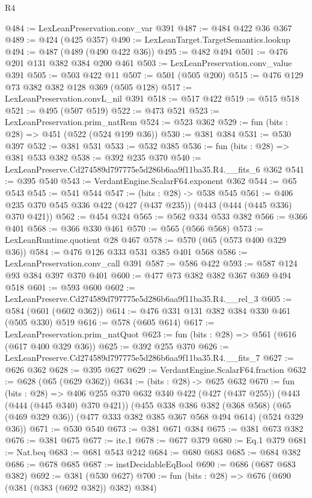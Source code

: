 \begin{lexlean}{R4}
\begin{coremodule}
@484 := LexLeanPreservation.conv_var @391
@487 := @484 @422 @36 @367
@489 := @424 (@425 @357)
@490 := LexLeanTarget.TargetSemantics.lookup
@494 := @487 (@489 (@490 @422 @36))
@495 := @482 @494
@501 := @476 @201 @131 @382 @384 @200 @461
@503 := LexLeanPreservation.conv_value @391
@505 := @503 @422 @11
@507 := @501 (@505 @200)
@515 := @476 @129 @73 @382 @382 @128 @369 (@505 @128)
@517 := LexLeanPreservation.convL_nil @391
@518 := @517 @422
@519 := @515 @518
@521 := @495 (@507 @519)
@522 := @473 @521
@523 := LexLeanPreservation.prim_natRem
@524 := @523 @362
@529 := fun (bits : @28) => @451 (@522 (@524 @199 @36))
@530 := @381 @384
@531 := @530 @397
@532 := @381 @531
@533 := @532 @385
@536 := fun (bits : @28) => @381 @533 @382
@538 := @392 @235 @370
@540 := LexLeanPreserve.Cd274589d797775e5d286b6aa9f11ba35.R4.__fits_6 @362
@541 := @395 @540
@543 := VerdantEngine.ScalarF64.exponent @362
@544 := @65 @543
@545 := @541 @544
@547 := (bits : @28) -> @538 @545
@561 := @406 @235 @370 @545 @336 @422 (@427 (@437 @235)) (@443 (@444 (@445 @336) @370 @421))
@562 := @454 @324
@565 := @562 @334 @533 @382
@566 := @366 @401
@568 := @366 @330 @461
@570 := @565 (@566 @568)
@573 := LexLeanRuntime.quotient @28 @467
@578 := @570 (@65 (@573 @400 @329 @36))
@584 := @476 @126 @333 @531 @385 @401 @568
@586 := LexLeanPreservation.conv_call @391
@587 := @586 @422
@593 := @587 @124 @93 @384 @397 @370 @401
@600 := @477 @73 @382 @382 @367 @369 @494 @518
@601 := @593 @600
@602 := LexLeanPreserve.Cd274589d797775e5d286b6aa9f11ba35.R4.__rel_3
@605 := @584 (@601 (@602 @362))
@614 := @476 @331 @131 @382 @384 @330 @461 (@505 @330) @519
@616 := @578 (@605 @614)
@617 := LexLeanPreservation.prim_natQuot
@623 := fun (bits : @28) => @561 (@616 (@617 @400 @329 @36))
@625 := @392 @255 @370
@626 := LexLeanPreserve.Cd274589d797775e5d286b6aa9f11ba35.R4.__fits_7
@627 := @626 @362
@628 := @395 @627
@629 := VerdantEngine.ScalarF64.fraction
@632 := @628 (@65 (@629 @362))
@634 := (bits : @28) -> @625 @632
@670 := fun (bits : @28) =>
  @406
    @255
    @370
    @632
    @340
    @422
    (@427 (@437 @255))
    (@443 (@444 (@445 @340) @370 @421))
    (@455
      @338
      @386
      @382
      (@368 @568)
      (@65 (@469 @329 @36))
      (@477 @333 @382 @385 @367 @568 @494 @614)
      (@524 @329 @36))
@671 := @530 @540
@673 := @381 @671 @384
@675 := @381 @673 @382
@676 := @381 @675
@677 := ite.{1}
@678 := @677 @379
@680 := Eq.{1} @379
@681 := Nat.beq
@683 := @681 @543 @242
@684 := @680 @683
@685 := @684 @382
@686 := @678 @685
@687 := instDecidableEqBool
@690 := @686 (@687 @683 @382)
@692 := @381 (@530 @627)
@700 := fun (bits : @28) => @676 (@690 (@381 (@383 (@692 @382)) @382) @384)

\end{coremodule}
\end{lexlean}
